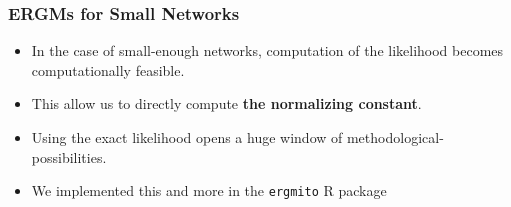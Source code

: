 \documentclass[aspectratio=169, 9pt]{beamer}
\newcommand{\ergmitopkg}[0]{\texttt{ergmito}}
\begin{document}
\begin{frame}[label=ergmito]
\frametitle{ERGMs for Small Networks}


\begin{itemize}[<+->]

\item In the case of small-enough networks, computation of the likelihood becomes
computationally feasible.

\item This allow us to directly compute {\bf\color{normconst} the normalizing constant}.\pause

\item Using the exact likelihood opens a huge window of methodological-possibilities.

\item We implemented this and more in the \ergmitopkg{} R package %
\end{itemize}


\end{frame}
\end{document}
